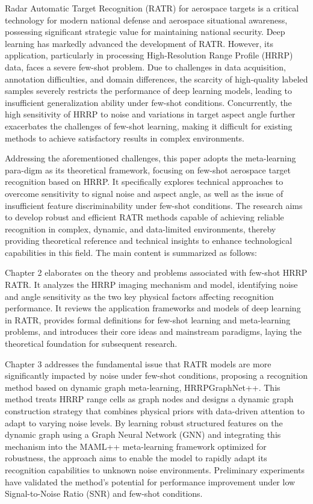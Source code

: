 
\begin{eabstract}
Radar Automatic Target Recognition (RATR) for aerospace targets is a critical technology for modern national defense and aerospace situational awareness, possessing significant strategic value for maintaining national security. Deep learning has markedly advanced the development of RATR. However, its application, particularly in processing High-Resolution Range Profile (HRRP) data, faces a severe few-shot problem. Due to challenges in data acquisition, annotation difficulties, and domain differences, the scarcity of high-quality labeled samples severely restricts the performance of deep learning models, leading to insufficient generalization ability under few-shot conditions. Concurrently, the high sensitivity of HRRP to noise and variations in target aspect angle further exacerbates the challenges of few-shot learning, making it difficult for existing methods to achieve satisfactory results in complex environments.

Addressing the aforementioned challenges, this paper adopts the meta-learning para-digm as its theoretical framework, focusing on few-shot aerospace target recognition based on HRRP. It specifically explores technical approaches to overcome sensitivity to signal noise and aspect angle, as well as the issue of insufficient feature discriminability under few-shot conditions. The research aims to develop robust and efficient RATR methods capable of achieving reliable recognition in complex, dynamic, and data-limited environments, thereby providing theoretical reference and technical insights to enhance technological capabilities in this field. The main content is summarized as follows:

Chapter 2 elaborates on the theory and problems associated with few-shot HRRP RATR. It analyzes the HRRP imaging mechanism and model, identifying noise and angle sensitivity as the two key physical factors affecting recognition performance. It reviews the application frameworks and models of deep learning in RATR, provides formal definitions for few-shot learning and meta-learning problems, and introduces their core ideas and mainstream paradigms, laying the theoretical foundation for subsequent research.

Chapter 3 addresses the fundamental issue that RATR models are more significantly impacted by noise under few-shot conditions, proposing a recognition method based on dynamic graph meta-learning, HRRPGraphNet++. This method treats HRRP range cells as graph nodes and designs a dynamic graph construction strategy that combines physical priors with data-driven attention to adapt to varying noise levels. By learning robust structured features on the dynamic graph using a Graph Neural Network (GNN) and integrating this mechanism into the MAML++ meta-learning framework optimized for robustness, the approach aims to enable the model to rapidly adapt its recognition capabilities to unknown noise environments. Preliminary experiments have validated the method's potential for performance improvement under low Signal-to-Noise Ratio (SNR) and few-shot conditions.


\end{eabstract}
